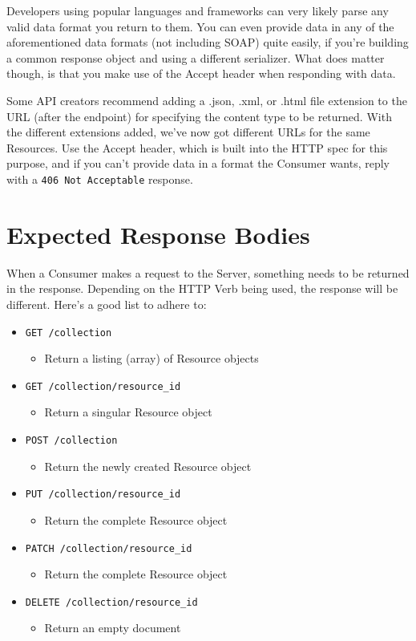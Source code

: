 \documentclass{book}
\begin{document}
Developers using popular languages and frameworks can very likely parse any valid data format you return to them. You can even provide data in any of the aforementioned data formats (not including SOAP) quite easily, if you're building a common response object and using a different serializer. What does matter though, is that you make use of the Accept header when responding with data.

Some API creators recommend adding a .json, .xml, or .html file extension to the URL (after the endpoint) for specifying the content type to be returned. With the different extensions added, we've now got different URLs for the same Resources. Use the Accept header, which is built into the HTTP spec for this purpose, and if you can't provide data in a format the Consumer wants, reply with a \texttt{406 Not Acceptable} response.


\chapter{Expected Response Bodies}

When a Consumer makes a request to the Server, something needs to be returned in the response. Depending on the HTTP Verb being used, the response will be different. Here's a good list to adhere to:

\begin{itemize}
\item \texttt{GET /collection}
    \begin{itemize}
    \item Return a listing (array) of Resource objects
    \end{itemize}
\item \texttt{GET /collection/resource\_id}
    \begin{itemize}
    \item Return a singular Resource object
    \end{itemize}
\item \texttt{POST /collection}
    \begin{itemize}
    \item Return the newly created Resource object
    \end{itemize}
\item \texttt{PUT /collection/resource\_id}
    \begin{itemize}
    \item Return the complete Resource object
    \end{itemize}
\item \texttt{PATCH /collection/resource\_id}
    \begin{itemize}
    \item Return the complete Resource object
    \end{itemize}
\item \texttt{DELETE /collection/resource\_id}
    \begin{itemize}
    \item Return an empty document
    \end{itemize}
\end{itemize}
\end{document}
